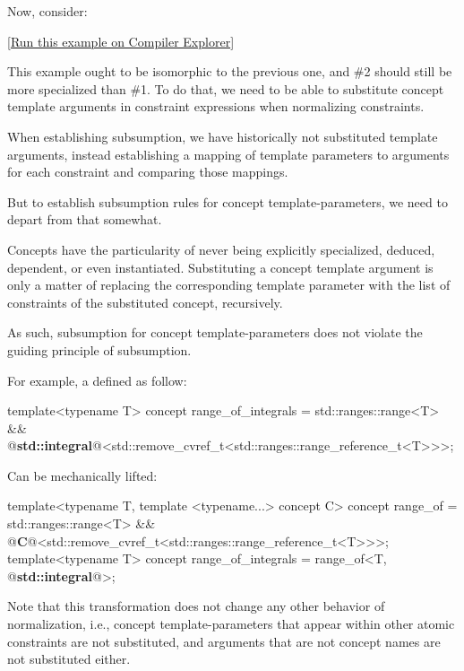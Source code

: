 \documentclass{wg21}
\begin{document}
Now, consider:


[\href{https://compiler-explorer.com/z/71qjW1WWP}{Run this example on Compiler Explorer}]

This example ought to be isomorphic to the previous one, and \#2 should still be more specialized than \#1.
To do that, we need to be able to substitute concept template arguments in constraint expressions when normalizing constraints.

When establishing subsumption, we have historically not substituted template arguments, instead establishing a mapping of template parameters to arguments for each
constraint and comparing those mappings.

But to establish subsumption rules for concept template-parameters, we need to depart from that somewhat.

Concepts have the particularity of never being explicitly specialized, deduced, dependent, or even instantiated.
Substituting a concept template argument is only a matter of replacing the corresponding template parameter with the list of constraints of the substituted
concept, recursively.

As such, subsumption for concept template-parameters does not violate the guiding principle of subsumption.

For example, a  defined as follow:

\begin{colorblock}
template<typename T>
concept range_of_integrals = std::ranges::range<T> && @\textbf{std::integral}@<std::remove_cvref_t<std::ranges::range_reference_t<T>>>;
\end{colorblock}

Can be mechanically lifted:

\begin{colorblock}
template<typename T, template <typename...> concept C>
concept range_of = std::ranges::range<T> && @\textbf{C}@<std::remove_cvref_t<std::ranges::range_reference_t<T>>>;
template<typename T>
concept range_of_integrals = range_of<T, @\textbf{std::integral}@>;
\end{colorblock}

Note that this transformation does not change any other behavior of normalization, i.e., concept template-parameters that appear within other atomic constraints
are not substituted, and arguments that are not concept names are not substituted either.
\end{document}
